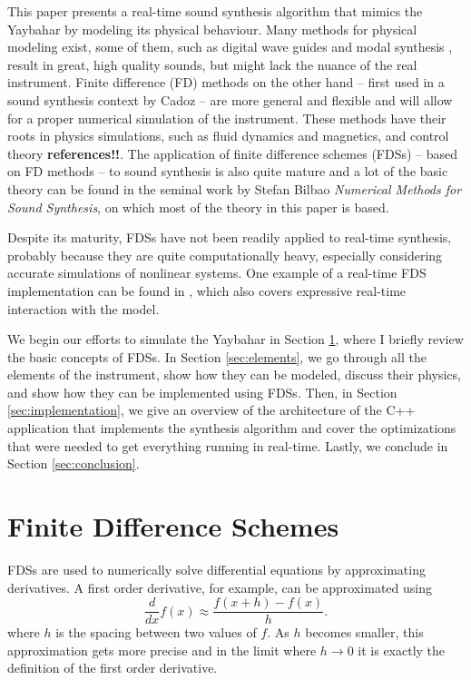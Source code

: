 \documentclass{article}
\begin{document}
This paper presents a real-time sound synthesis algorithm that mimics the Yaybahar by modeling its physical behaviour.
Many methods for physical modeling exist, some of them, such as digital wave guides \cite{smith1992physical} and modal synthesis \cite{morrison1993mosaic}, result in great, high quality sounds, but might lack the nuance of the real instrument.
Finite difference (FD) methods on the other hand -- first used in a sound synthesis context by Cadoz \cite{cadoz79} -- are more general and flexible and will allow for a proper numerical simulation of the instrument.
These methods have their roots in physics simulations, such as fluid dynamics and magnetics, and control theory \textbf{references!!}.
The application of finite difference schemes (FDSs) -- based on FD methods -- to sound synthesis is also quite mature and a lot of the basic theory can be found in the seminal work by Stefan Bilbao \textit{Numerical Methods for Sound Synthesis}\cite{bilbao_numerical_2009}, on which most of the theory in this paper is based.

Despite its maturity, FDSs have not been readily applied to real-time synthesis, probably because they are quite computationally heavy, especially considering accurate simulations of nonlinear systems.
One example of a real-time FDS implementation can be found in \cite{willemsen_real-time_2019}, which also covers expressive real-time interaction with the model.

We begin our efforts to simulate the Yaybahar in Section \ref{sec:finiteDifferenceSchemes}, where I briefly review the basic concepts of FDSs.
In Section \ref{sec:elements}, we go through all the elements of the instrument, show how they can be modeled, discuss their physics, and show how they can be implemented using FDSs.
Then, in Section \ref{sec:implementation}, we give an overview of the architecture of the C++ application that implements the synthesis algorithm and cover the optimizations that were needed to get everything running in real-time.
Lastly, we conclude in Section \ref{sec:conclusion}.

\section{Finite Difference Schemes}
\label{sec:finiteDifferenceSchemes}

FDSs are used to numerically solve differential equations by approximating derivatives. A first order derivative, for example, can be approximated using
\begin{equation}
  \frac{d}{dx} f(x) \approx \frac{f(x + h) - f(x)}{h}.
\end{equation}
where $h$ is the spacing between two values of $f$. As $h$ becomes smaller, this approximation gets more precise and in the limit where $h\rightarrow 0$ it is exactly the definition of the first order derivative.
\end{document}
